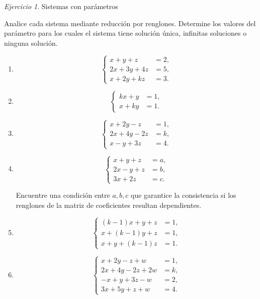 \documentclass[12pt]{article}
\theoremstyle{remark}
\newtheorem{Ejer}[definicion]{Ejercicio}
\newcommand{\sistema}[1]{%
\[
\left\{
\begin{aligned}
#1
\end{aligned}
\right.
\]
}
\begin{document}
\begin{Ejer} Sistemas con parámetros

Analice cada sistema mediante reducción por renglones. Determine los valores del parámetro
para los cuales el sistema tiene solución única, infinitas soluciones o ninguna solución.

\begin{enumerate}[resume]

\item
\sistema{
x+y+z&=2,\\
2x+3y+4z&=5,\\
x+2y+kz&=3.
}

\item
\sistema{
kx+y&=1,\\
x+ky&=1.
}

\item
\sistema{
x+2y-z&=1,\\
2x+4y-2z&=k,\\
x-y+3z&=4.
}

\item 
\sistema{
x+y+z&=a,\\
2x-y+z&=b,\\
3x+2z&=c.
}
Encuentre una condición entre $a,b,c$ que garantice la consistencia si los renglones
de la matriz de coeficientes resultan dependientes.

\item
\sistema{
(k-1)x+y+z&=1,\\
x+(k-1)y+z&=1,\\
x+y+(k-1)z&=1.
}

\item 
\sistema{
x+2y-z+w&=1,\\
2x+4y-2z+2w&=k,\\
-x+y+3z-w&=2,\\
3x+5y+z+w&=4.
}

\end{enumerate}
\end{Ejer}
\end{document}
